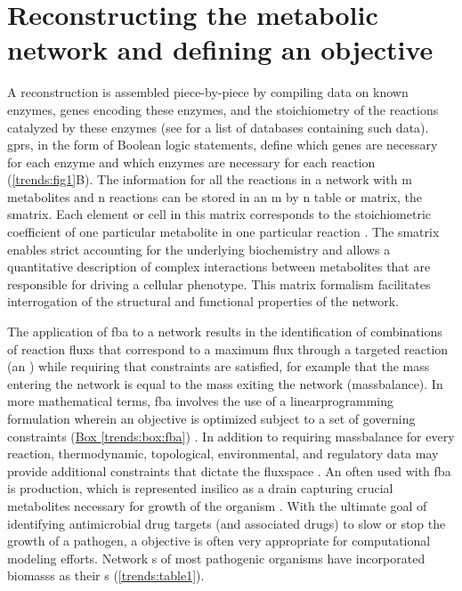 \section[Reconstructing metabolic networks]{Reconstructing the metabolic network and defining an objective}

A \gls{reconstruction} is assembled piece-by-piece 
by compiling data on known enzymes, genes encoding these enzymes, 
and the stoichiometry of the reactions catalyzed by these enzymes 
(see \cite{Durot:2009kb} for a list of databases containing such data). \glspl{gpr}, 
in the form of Boolean logic statements, define 
which genes are necessary for each enzyme and which enzymes are 
necessary for each reaction \cite{Thiele:2010fr} (\autoref{trends:fig1}B). The information for 
all the reactions in a network  with m metabolites 
and n reactions can be stored in an m by n table or matrix, the 
\gls{smatrix}. Each element or cell in this matrix 
corresponds to the stoichiometric coefficient of one particular 
metabolite in one particular reaction \cite{Thiele:2010fr,Lee:2006je}. The \gls{smatrix} enables 
strict accounting for the underlying biochemistry and allows a 
quantitative description of complex interactions between metabolites 
that are responsible for driving a cellular phenotype. This matrix 
formalism facilitates interrogation of the structural and functional 
properties of the network.

The application of \gls{fba} to a network  results in the 
identification of combinations of reaction \glspl{flux} that correspond 
to a maximum \gls{flux} through a targeted reaction (an ) while 
requiring that constraints are satisfied, for example that the 
mass entering the network is equal to the mass exiting the network (\gls{massbalance}). 
In more mathematical terms, \gls{fba} involves the use of a 
\gls{linearprogramming} formulation wherein an objective is optimized subject 
to a set of governing constraints (\hyperref[trends:box:fba]{Box \ref{trends:box:fba}}) 
\cite{Oberhardt:2009jw,Lee:2006je,Gianchandani:2010gs}. In addition 
to requiring \gls{massbalance} for every reaction, thermodynamic, 
topological, environmental, and regulatory data may provide 
additional constraints that dictate the \gls{fluxspace} \cite{Price:2004hx}. 
An  often used with \gls{fba} is  production, which is 
represented \gls{insilico} as a drain capturing crucial metabolites 
necessary for growth of the organism \cite{Feist:2010hq,Varma:1993hd}. With the ultimate 
goal of identifying antimicrobial drug targets (and associated 
drugs) to slow or stop the growth of a pathogen, a  objective
is often very appropriate for computational modeling efforts. 
Network s of most pathogenic organisms have incorporated 
\glspl{biomass} as their s (\autoref{trends:table1}).

